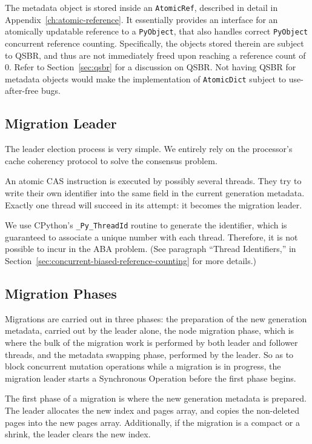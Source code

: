 The metadata object is stored inside an \texttt{AtomicRef}, described in detail in Appendix~\ref{ch:atomic-reference}.
It essentially provides an interface for an atomically updatable reference to a \texttt{PyObject}, that also handles correct \texttt{PyObject} concurrent reference counting.
Specifically, the objects stored therein are subject to QSBR, and thus are not immediately freed upon reaching a reference count of 0.
Refer to Section~\ref{sec:qsbr} for a discussion on QSBR\@.
Not having QSBR for metadata objects would make the implementation of \texttt{AtomicDict} subject to use-after-free bugs.

\subsection{Migration Leader}\label{subsec:migration-leader}

The leader election process is very simple.
We entirely rely on the processor's cache coherency protocol to solve the consensus problem.

An atomic CAS instruction is executed by possibly several threads.
They try to write their own identifier into the same field in the current generation metadata.
Exactly one thread will succeed in its attempt: it becomes the migration leader.

We use CPython's \texttt{\_Py\_ThreadId} routine to generate the identifier, which is guaranteed to associate a unique number with each thread.
Therefore, it is not possible to incur in the ABA problem.
(See paragraph ``Thread Identifiers,'' in Section~\ref{sec:concurrent-biased-reference-counting} for more details.)

\subsection{Migration Phases}\label{subsec:migration-phases}

Migrations are carried out in three phases: the preparation of the new generation metadata, carried out by the leader alone, the node migration phase, which is where the bulk of the migration work is performed by both leader and follower threads, and the metadata swapping phase, performed by the leader.
So as to block concurrent mutation operations while a migration is in progress, the migration leader starts a Synchronous Operation before the first phase begins.

The first phase of a migration is where the new generation metadata is prepared.
The leader allocates the new index and pages array, and copies the non-deleted pages into the new pages array.
Additionally, if the migration is a compact or a shrink, the leader clears the new index.

